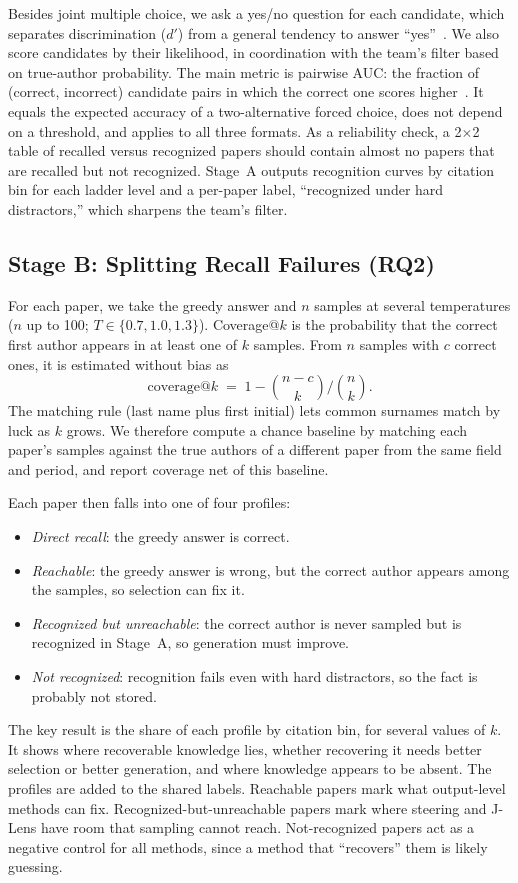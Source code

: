 \documentclass[sigconf,nonacm]{acmart}
\begin{document}
Besides joint multiple choice, we ask a yes/no question for each candidate, which separates discrimination ($d'$) from a general tendency to answer ``yes''~\cite{green1966sdt}. We also score candidates by their likelihood, in coordination with the team's filter based on true-author probability. The main metric is pairwise AUC: the fraction of (correct, incorrect) candidate pairs in which the correct one scores higher~\cite{gekhman2025insideout}. It equals the expected accuracy of a two-alternative forced choice, does not depend on a threshold, and applies to all three formats. As a reliability check, a 2$\times$2 table of recalled versus recognized papers should contain almost no papers that are recalled but not recognized. Stage~A outputs recognition curves by citation bin for each ladder level and a per-paper label, ``recognized under hard distractors,'' which sharpens the team's filter.

\subsection{Stage B: Splitting Recall Failures (RQ2)}

For each paper, we take the greedy answer and $n$ samples at several temperatures ($n$ up to 100; $T \in \{0.7, 1.0, 1.3\}$). Coverage@$k$ is the probability that the correct first author appears in at least one of $k$ samples. From $n$ samples with $c$ correct ones, it is estimated without bias as~\cite{chen2021codex}
\[
\text{coverage@}k \;=\; 1 - \binom{n-c}{k} \Big/ \binom{n}{k}.
\]
The matching rule (last name plus first initial) lets common surnames match by luck as $k$ grows. We therefore compute a chance baseline by matching each paper's samples against the true authors of a different paper from the same field and period, and report coverage net of this baseline.

Each paper then falls into one of four profiles:
\begin{itemize}
\item \emph{Direct recall}: the greedy answer is correct.
\item \emph{Reachable}: the greedy answer is wrong, but the correct author appears among the samples, so selection can fix it.
\item \emph{Recognized but unreachable}: the correct author is never sampled but is recognized in Stage~A, so generation must improve.
\item \emph{Not recognized}: recognition fails even with hard distractors, so the fact is probably not stored.
\end{itemize}
The key result is the share of each profile by citation bin, for several values of $k$. It shows where recoverable knowledge lies, whether recovering it needs better selection or better generation, and where knowledge appears to be absent. The profiles are added to the shared labels. Reachable papers mark what output-level methods can fix. Recognized-but-unreachable papers mark where steering and J-Lens have room that sampling cannot reach. Not-recognized papers act as a negative control for all methods, since a method that ``recovers'' them is likely guessing.
\end{document}
